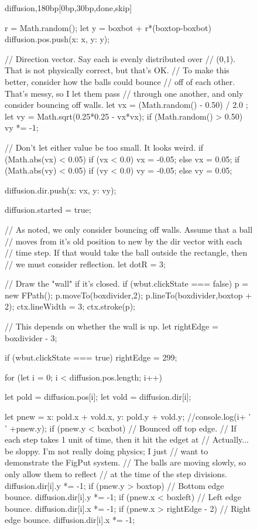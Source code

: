 \documentclass[10pt]{article}
\begin{document}
\begin{figure}
\begin{figput}{diffusion,180bp}[0bp,30bp,done,skip]
{{{          r = Math.random();
          let y = boxbot + r*(boxtop-boxbot)
          diffusion.pos.push({x: x, y: y});

          // Direction vector. Say each is evenly distributed over
          // (0,1). That is not physically correct, but that's OK.
          // To make this better, consider how the balls could bounce
          // off of each other. That's messy, so I let them pass
          // through one another, and only consider bouncing off walls.
          let vx = (Math.random() - 0.50) / 2.0 ;
          let vy = Math.sqrt(0.25*0.25 - vx*vx);
          if (Math.random() > 0.50)
            vy *= -1;

          // Don't let either value be too small. It looks weird.
          if (Math.abs(vx) < 0.05)
            {
              if (vx < 0.0)
                vx = -0.05;
              else
                vx = 0.05;
            }
          if (Math.abs(vy) < 0.05)
            {
              if (vy < 0.0)
                vy = -0.05;
              else
                vy = 0.05;
            }

          diffusion.dir.push({x: vx, y: vy});
        }

      diffusion.started = true;
    }

    // As noted, we only consider bouncing off walls. Assume that a ball
    // moves from it's old position to new by the dir vector with each
    // time step. If that would take the ball outside the rectangle, then
    // we must consider reflection.
    let dotR = 3;
    
    // Draw the "wall" if it's closed.
    if (wbut.clickState === false)
      {
        p = new FPath();
        p.moveTo(boxdivider,2);
	p.lineTo(boxdivider,boxtop + 2);
	ctx.lineWidth = 3;
	ctx.stroke(p);
      }
    
    // This depends on whether the wall is up.
    let rightEdge = boxdivider - 3;

    if (wbut.clickState === true)
      rightEdge = 299;

    for (let i = 0; i < diffusion.pos.length; i++)
      {
        let pold = diffusion.pos[i];
        let vold = diffusion.dir[i];

        let pnew = {x: pold.x + vold.x, y: pold.y + vold.y};
        //console.log(i+ ' ' +pnew.y);
        if (pnew.y < boxbot)
          {
            // Bounced off top edge.
            // If each step takes 1 unit of time, then it hit the edget at
            // Actually... be sloppy. I'm not really doing physics; I just
            // want to demonstrate the FigPut system.
            // The balls are moving slowly, so only allow them to reflect
            // at the time of the step divisions.
            diffusion.dir[i].y *= -1;
          }
          if (pnew.y > boxtop)
            {
              // Bottom edge bounce.
              diffusion.dir[i].y *= -1;
            }
          if (pnew.x < boxleft)
            // Left edge bounce.
            diffusion.dir[i].x *= -1;
          if (pnew.x > rightEdge - 2)
            // Right edge bounce.
            diffusion.dir[i].x *= -1;

}}
\end{figput}
\end{figure}
\end{document}
